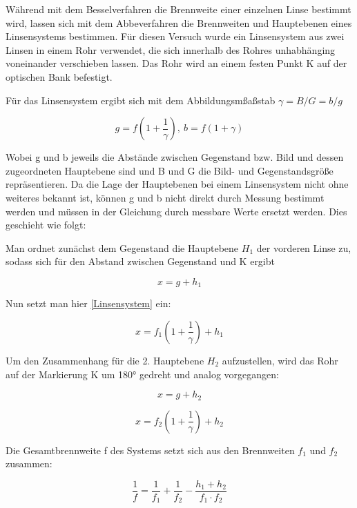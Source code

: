 Während mit dem Besselverfahren die Brennweite einer einzelnen Linse bestimmt wird, lassen sich mit dem Abbeverfahren die Brennweiten und Hauptebenen eines Linsensystems bestimmen.
Für diesen Versuch wurde ein Linsensystem aus zwei Linsen in einem Rohr verwendet, die sich innerhalb des Rohres unhabhänging voneinander verschieben lassen.
Das Rohr wird an einem festen Punkt K auf der optischen Bank befestigt.

Für das Linsensystem ergibt sich mit dem Abbildungsmßaßstab $\gamma = B/G = b/g$

\begin{equation} \label{Linsensystem}
    g = f(1 + \frac{1}{\gamma}),\ b = f(1+\gamma)
\end{equation}

Wobei g und b jeweils die Abstände zwischen Gegenstand bzw. Bild und dessen zugeordneten Hauptebene sind und B und G die Bild- und Gegenstandsgröße repräsentieren.
Da die Lage der Hauptebenen bei einem Linsensystem nicht ohne weiteres bekannt ist, können g und b nicht direkt durch Messung bestimmt werden und müssen in der Gleichung
durch messbare Werte ersetzt werden.
Dies geschieht wie folgt:

Man ordnet zunächst dem Gegenstand die Hauptebene $H_1$ der vorderen Linse zu, sodass sich für den Abstand zwischen Gegenstand und K ergibt

\begin{equation} \label{x1}
    x = g + h_1
\end{equation}

Nun setzt man hier \ref{Linsensystem} ein:

\begin{equation} \label{x2}
    x = f_1(1 + \frac{1}{\gamma}) + h_1
\end{equation}

Um den Zusammenhang für die 2. Hauptebene $H_2$ aufzustellen, wird das Rohr auf der Markierung K um 180° gedreht und analog vorgegangen:

\begin{equation} \label{x2}
    x = g + h_2
\end{equation}

\begin{equation} \label{x2}
    x = f_2(1 + \frac{1}{\gamma}) + h_2
\end{equation}

Die Gesamtbrennweite f des Systems setzt sich aus den Brennweiten $f_1$ und $f_2$ zusammen:

\begin{equation}
    \frac{1}{f} = \frac{1}{f_1} + \frac{1}{f_2} - \frac{h_1 + h_2}{f_1 \cdot f_2}
\end{equation}

